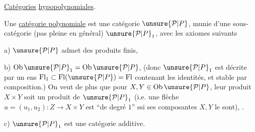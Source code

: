 \uline{Catégories} \uline{hypopolynomiales}.

Une \uline{catégorie polynomiale} est une catégorie $\unsure{\mathcal P|P}$, munie d'une sous-catégorie (pas pleine en général) $\unsure{\mathcal P|P}_1$, avec les axiomes suivants

a) $\unsure{\mathcal P|P}$ admet des produits finis, 

b) $\operatorname{Ob}\unsure{\mathcal P|P}_1=\operatorname{Ob}\unsure{\mathcal P|P}$, 
(donc $\unsure{\mathcal P|P}_1$ est décrite par un ens $\operatorname{Fl}_1\subset\operatorname{Fl}(\unsure{\mathcal P|P})=\operatorname{Fl}$ contenant les identités, et stable par composition.) On veut de plus que  pour $X,Y\in\operatorname{Ob}\unsure{\mathcal P|P}$, leur produit $X\times Y$ soit un produit de $\unsure{\mathcal P|P}_1$ (i.e. une flèche $u=(u_1,u_2):Z\longrightarrow X\times Y$ est ``de degré $1$'' ssi ses composantes $X,Y$ le sont), .

c) $\unsure{\mathcal P|P}_1$ est une catégorie additive.

